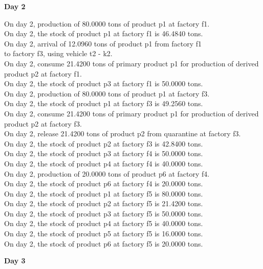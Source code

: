 \textbf{Day 2}
\vspace{-1.6em}
\begin{tabbing}
On day 2, production of 80.0000 tons of product p1 at factory f1. \\
On day 2, the stock of product p1 at factory f1 is 46.4840 tons. \\
On day 2, arrival of 12.0960 tons of product p1 from factory f1 \\ to factory f3, using vehicle t2 - k2. \\
On day 2, consume 21.4200 tons of primary product p1 for production of derived product p2 at factory f1. \\
On day 2, the stock of product p3 at factory f1 is 50.0000 tons. \\
On day 2, production of 80.0000 tons of product p1 at factory f3. \\
On day 2, the stock of product p1 at factory f3 is 49.2560 tons. \\
On day 2, consume 21.4200 tons of primary product p1 for production of derived product p2 at factory f3. \\
On day 2, release 21.4200 tons of product p2 from quarantine at factory f3. \\
On day 2, the stock of product p2 at factory f3 is 42.8400 tons. \\
On day 2, the stock of product p3 at factory f4 is 50.0000 tons. \\
On day 2, the stock of product p4 at factory f4 is 40.0000 tons. \\
On day 2, production of 20.0000 tons of product p6 at factory f4. \\
On day 2, the stock of product p6 at factory f4 is 20.0000 tons. \\
On day 2, the stock of product p1 at factory f5 is 80.0000 tons. \\
On day 2, the stock of product p2 at factory f5 is 21.4200 tons. \\
On day 2, the stock of product p3 at factory f5 is 50.0000 tons. \\
On day 2, the stock of product p4 at factory f5 is 40.0000 tons. \\
On day 2, the stock of product p5 at factory f5 is 16.0000 tons. \\
On day 2, the stock of product p6 at factory f5 is 20.0000 tons. \\
\end{tabbing} \vspace{-2.0em}
\textbf{Day 3}
\vspace{-1.6em}
